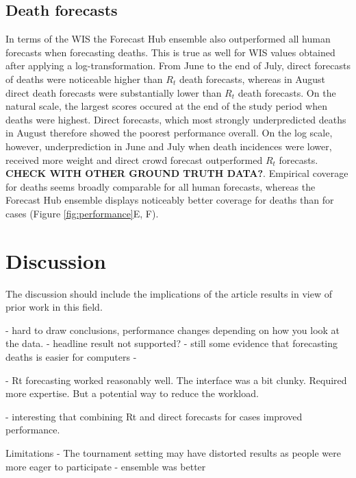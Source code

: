 \documentclass[10pt,a4paper,twocolumn]{article}
\begin{document}
\subsection*{Death forecasts} 

In terms of the WIS the Forecast Hub ensemble also outperformed all human forecasts when forecasting deaths. This is true as well for WIS values obtained after applying a log-transformation. From June to the end of July, direct forecasts of deaths were noticeable higher than $R_t$ death forecasts, whereas in August direct death forecasts were substantially lower than $R_t$ death forecasts. On the natural scale, the largest scores occured at the end of the study period when deaths were highest. Direct forecasts, which most strongly underpredicted deaths in August therefore showed the poorest performance overall. On the log scale, however, underprediction in June and July when death incidences were lower, received more weight and direct crowd forecast outperformed $R_t$ forecasts. \textbf{CHECK WITH OTHER GROUND TRUTH DATA?}. Empirical coverage for deaths seems broadly comparable for all human forecasts, whereas the Forecast Hub ensemble displays noticeably better coverage for deaths than for cases (Figure \ref{fig:performance}E, F). 



\section*{Discussion}
The discussion should include the implications of the article results in view of prior work in this field.

- hard to draw conclusions, performance changes depending on how you look at the data. 
- headline result not supported? 
- still some evidence that forecasting deaths is easier for computers
- 

- Rt forecasting worked reasonably well. The interface was a bit clunky. Required more expertise. But a potential way to reduce the workload. 

- interesting that combining Rt and direct forecasts for cases improved performance. 


Limitations
- The tournament setting may have distorted results as people were more eager to participate
- ensemble was better
\end{document}
